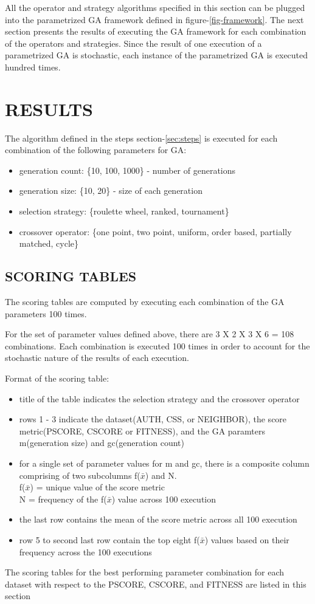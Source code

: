 \documentclass[12pt,a4paper]{article}
\begin{document}
	All the operator and strategy algorithms specified in this section can be plugged into the parametrized GA framework defined in figure-\ref{fig-framework}. The next section presents the results of executing the GA framework for each combination of the operators and strategies. Since the result of one execution of a parametrized GA is stochastic, each instance of the parametrized GA is executed hundred times.
	
	\section{\large RESULTS}
		The algorithm defined in the steps section-\ref{sec:steps} is executed for each combination of the following parameters for GA:
		\begin{itemize}
			\item generation count: \{10, 100, 1000\} - number of generations
			\item generation size: \{10, 20\} - size of each generation
			\item selection strategy: \{roulette wheel, ranked, tournament\}
			\item crossover operator: \{one point, two point, uniform, order based, partially matched, cycle\}
		\end{itemize}
 
	\subsection{SCORING TABLES}
	The scoring tables are computed by executing each combination of the GA parameters 100 times.\par
	For the set of parameter values defined above, there are 3 X 2 X 3 X 6 = 108 combinations. Each combination is executed 100 times in order to account for the stochastic nature of the results of each execution. \par
	Format of the scoring table:
	\begin{itemize}
		\item title of the table indicates the selection strategy and the crossover operator
		\item rows 1 - 3 indicate the dataset(AUTH, CSS, or NEIGHBOR), the score metric(PSCORE, CSCORE or FITNESS), and the GA paramters m(generation size) and gc(generation count)
		\item for a single set of parameter values for m and gc, there is a composite column comprising of two subcolumns f($\bar{x}$) and N. \\
		f($\bar{x}$) = unique value of the score metric \\
		N = frequency of the f($\bar{x}$) value across 100 execution
		\item the last row contains the mean of the score metric across all 100 execution
		\item row 5 to second last row contain the top eight f($\bar{x}$) values based on their frequency across the 100 executions
	\end{itemize}
	The scoring tables for the best performing parameter combination for each dataset with respect to the PSCORE, CSCORE, and FITNESS are listed in this section
\end{document}
